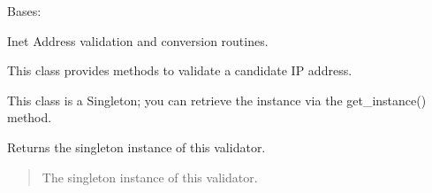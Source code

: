 \documentclass[letterpaper,10pt,english]{sphinxmanual}
\begin{document}
\begin{fulllineitems}
\label{\detokenize{apache_commons_validator_python.routines:apache_commons_validator_python.routines.inet_address_validator.InetAddressValidator}}
\pysigstartsignatures
{}
\pysigstopsignatures
\sphinxAtStartPar
Bases: 

\sphinxAtStartPar
Inet Address validation and conversion routines.

\sphinxAtStartPar
This class provides methods to validate a candidate IP address.

\sphinxAtStartPar
This class is a Singleton; you can retrieve the instance via the get\_instance() method.

\begin{fulllineitems}
\label{\detokenize{apache_commons_validator_python.routines:apache_commons_validator_python.routines.inet_address_validator.InetAddressValidator.cloneable}}
\pysigstartsignatures
{}
\pysigstopsignatures
\end{fulllineitems}


\begin{fulllineitems}
\label{\detokenize{apache_commons_validator_python.routines:apache_commons_validator_python.routines.inet_address_validator.InetAddressValidator.get_instance}}
\pysigstartsignatures
{}
\pysigstopsignatures
\sphinxAtStartPar
Returns the singleton instance of this validator.
\begin{quote}\begin{description}
\sphinxAtStartPar
The singleton instance of this validator.


\end{description}
\end{quote}
\end{fulllineitems}
\end{fulllineitems}
\end{document}
